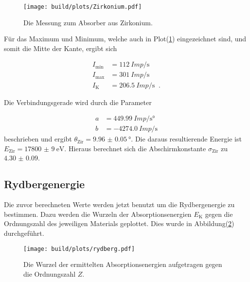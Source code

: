           \begin{figure}[H]
            \centering
            \texttt{[image: build/plots/Zirkonium.pdf]}
            \caption{Die Messung zum Absorber aus Zirkonium.}
            \label{fig:zirkonium}
          \end{figure}

          \noindent Für das Maximum und Minimum, welche auch in Plot(\ref{fig:zirkonium}) eingezeichnet sind, und somit die Mitte der Kante, ergibt sich 
          

          \begin{align*}
              I_{\text{min}} &= \SI{112}{Imp\per\second}\\
              I_{\text{max}} &= \SI{301}{Imp\per\second}\\
              I_{\text{K}} &= \SI{206.5}{Imp\per\second} \; \; \text{.}
          \end{align*}

          \noindent Die Verbindungsgerade wird durch die Parameter 

          \begin{align*}
              a & = \SI{449.99}{Imp\per\second\degree}\\
              b & = \SI{-4274.0}{Imp\per\second}
          \end{align*}
          \noindent beschrieben und ergibt $\theta_{\text{Zir}} = \SI{9.96(5)}{\degree}$. Die daraus resultierende Energie ist $E_{\text{Zir}} = \SI{17800(9)}{\electronvolt}$. 
          Hieraus berechnet sich die Abschirmkonstante $\sigma_{\text{Zir}}$ zu $ \num{4.30(9)}$.


    \subsection{Rydbergenergie}

          \noindent Die zuvor berechneten Werte werden jetzt benutzt um die Rydbergenergie zu bestimmen. Dazu werden die Wurzeln der 
          Absorptionsenergien $E_{\text{K}}$ gegen die Ordnungszahl des jeweiligen Materials geplottet. Dies wurde in 
          Abbildung(\ref{fig:rydberg}) durchgeführt.

          \begin{figure}[H]
            \centering
            \texttt{[image: build/plots/rydberg.pdf]}
            \caption{Die Wurzel der ermittelten Absorptionsenergien aufgetragen gegen die Ordnungszahl $Z$.}
            \label{fig:rydberg}
          \end{figure}

